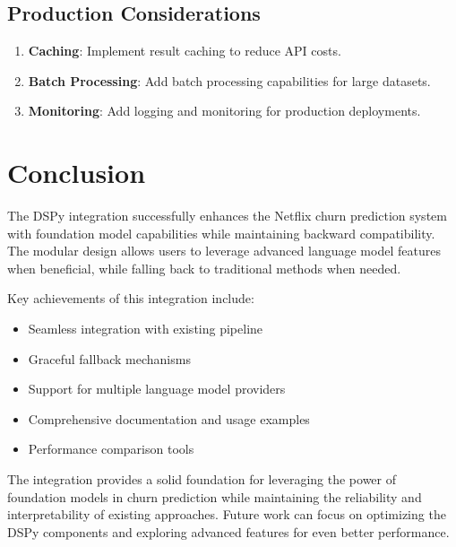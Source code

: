 \documentclass[11pt]{article}
\begin{document}
\subsection{Production Considerations}

\begin{enumerate}
    \item \textbf{Caching}: Implement result caching to reduce API costs.
    \item \textbf{Batch Processing}: Add batch processing capabilities for large datasets.
    \item \textbf{Monitoring}: Add logging and monitoring for production deployments.
\end{enumerate}

\section{Conclusion}

The DSPy integration successfully enhances the Netflix churn prediction system with foundation model capabilities while maintaining backward compatibility. The modular design allows users to leverage advanced language model features when beneficial, while falling back to traditional methods when needed.

Key achievements of this integration include:
\begin{itemize}
    \item Seamless integration with existing pipeline
    \item Graceful fallback mechanisms
    \item Support for multiple language model providers
    \item Comprehensive documentation and usage examples
    \item Performance comparison tools
\end{itemize}

The integration provides a solid foundation for leveraging the power of foundation models in churn prediction while maintaining the reliability and interpretability of existing approaches. Future work can focus on optimizing the DSPy components and exploring advanced features for even better performance.
\end{document}
